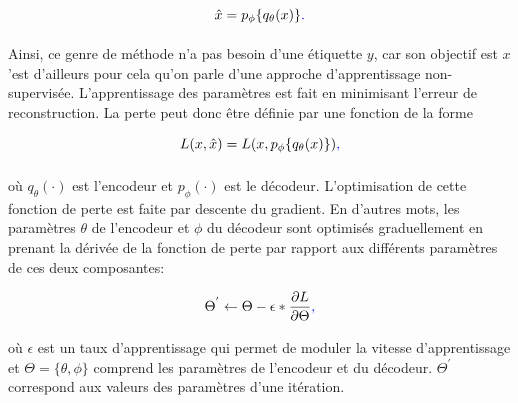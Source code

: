 \begin{gather} \label{eq:output}
	\hat{x} = p_\phi{\{q_\theta(x)\}}\DIFaddbegin \DIFadd{.
}\DIFaddend \end{gather}

 Ainsi, ce genre de méthode n'a pas besoin d'une étiquette $y$, car son objectif est \DIFdelbegin {}\DIFdelend \DIFaddbegin {}\DIFaddend $x$ \DIFdelbegin {}\DIFdelend \DIFaddbegin {}\DIFaddend 'est d'ailleurs pour cela qu'on parle d'une approche d'apprentissage non-supervisée. L'apprentissage des paramètres est fait en \DIFdelbegin {}\DIFdelend minimisant l'erreur de reconstruction. La perte peut donc être définie par une fonction de la forme
\DIFdelbegin \DIFdel{:
}\DIFdelend 

\begin{gather}  \label{eq:loss}
L(x, \hat{x}) = L(x, p_\phi{\{q_\theta(x)\}})\DIFaddbegin \DIFadd{,
}\DIFaddend \end{gather}


\noindent où $q_{\theta}(\cdot)$ est l'encodeur et $p_{\phi}(\cdot)$ est le décodeur. L'optimisation de cette fonction de perte est faite par descente du gradient. En d'autres mots, les paramètres $\theta$ de l'encodeur et $\phi$ du décodeur sont optimisés graduellement en prenant la dérivée de la fonction de perte par rapport aux différents paramètres de ces deux composantes:


\begin{equation} \label{optim}
\Theta^{'} \leftarrow \Theta-\epsilon*\frac{\partial L}{\partial\Theta}\DIFaddbegin \DIFadd{,
}\DIFaddend \end{equation}

\noindent où $\epsilon$ est un taux d'apprentissage qui permet de moduler la vitesse d'apprentissage et $\Theta = \{\theta, \phi\}$ comprend les paramètres de l'encodeur et du décodeur. $\Theta^{'}$\DIFaddbegin \DIFadd{; }\DIFaddend correspond aux valeurs des paramètres \DIFdelbegin {}\DIFdelend \DIFaddbegin {}\DIFaddend d'une itération. \DIFaddbegin {}\DIFaddend 

